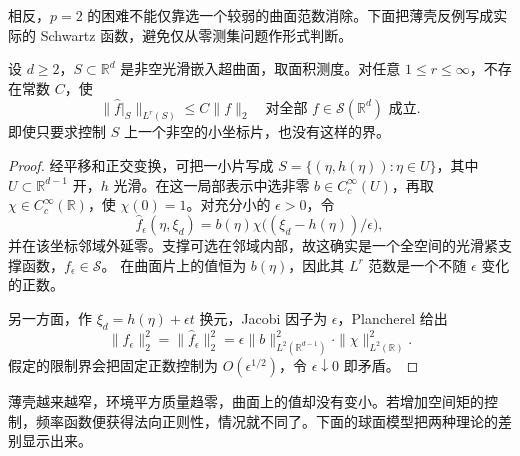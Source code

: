\ProseParagraphBreak
相反，\(p=2\) 的困难不能仅靠选一个较弱的曲面范数消除。下面把薄壳反例写成实际的 Schwartz 函数，避免仅从零测集问题作形式判断。

\begin{proposition}[薄壳输入]\label{b2:prop:23-thin-shell}
设 \(d\geq2\)，\(S\subset\mathbb R^d\) 是非空光滑嵌入超曲面，取面积测度。对任意 \(1\leq r\leq\infty\)，不存在常数 \(C\)，使
\[
 \|\widehat f|_S\|_{L^r(S)}\leq C\|f\|_2
 \quad\text{对全部 }f\in\mathcal S(\mathbb R^d)\text{ 成立}.
\]
即使只要求控制 \(S\) 上一个非空的小坐标片，也没有这样的界。
\end{proposition}
\begin{proof}
经平移和正交变换，可把一小片写成
\(S=\{(\eta,h(\eta)):\eta\in U\}\)，其中 \(U\subset\mathbb R^{d-1}\) 开，\(h\) 光滑。在这一局部表示中选非零
\(b\in C_c^\infty(U)\)，再取 \(\chi\in C_c^\infty(\mathbb R)\)，使 \(\chi(0)=1\)。对充分小的 \(\epsilon>0\)，令
\[
 \widehat f_\epsilon(\eta,\xi_d)
 =b(\eta)\chi\bigl((\xi_d-h(\eta))/\epsilon\bigr),
\]
并在该坐标邻域外延零。支撑可选在邻域内部，故这确实是一个全空间的光滑紧支撑函数，\(f_\epsilon\in\mathcal S\)。
在曲面片上的值恒为 \(b(\eta)\)，因此其 \(L^r\) 范数是一个不随 \(\epsilon\) 变化的正数。

另一方面，作 \(\xi_d=h(\eta)+\epsilon t\) 换元，Jacobi 因子为 \(\epsilon\)，Plancherel 给出
\[
 \|f_\epsilon\|_2^2
 =\|\widehat f_\epsilon\|_2^2
 =\epsilon\|b\|_{L^2(\mathbb R^{d-1})}^2
       \cdot\|\chi\|_{L^2(\mathbb R)}^2.
\]
假定的限制界会把固定正数控制为 \(O(\epsilon^{1/2})\)，令 \(\epsilon\downarrow0\) 即矛盾。
\end{proof}

薄壳越来越窄，环境平方质量趋零，曲面上的值却没有变小。若增加空间矩的控制，频率函数便获得法向正则性，情况就不同了。下面的球面模型把两种理论的差别显示出来。

